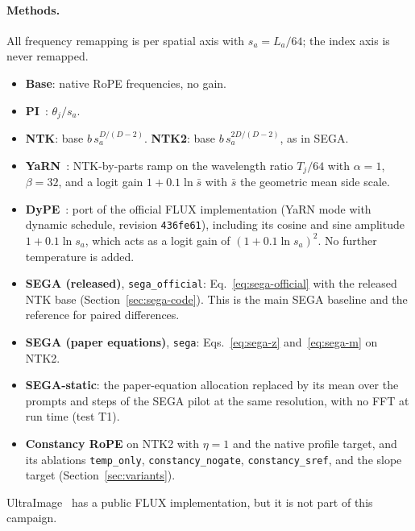\paragraph{Methods.}
All frequency remapping is per spatial axis with $s_a=L_a/64$; the index axis is never remapped.
\begin{itemize}
  \item \textbf{Base}: native RoPE frequencies, no gain.
  \item \textbf{PI}~\citep{chen2023pi}: $\theta_j/s_a$.
  \item \textbf{NTK}: base $b\,s_a^{D/(D-2)}$. \textbf{NTK2}: base $b\,s_a^{2D/(D-2)}$, as in SEGA.
  \item \textbf{YaRN}~\citep{peng2024yarn}: NTK-by-parts ramp on the wavelength ratio $T_j/64$ with $\alpha=1$, $\beta=32$, and a logit gain $1+0.1\ln\bar s$ with $\bar s$ the geometric mean side scale.
  \item \textbf{DyPE}~\citep{issachar2025dype}: port of the official FLUX implementation (YaRN mode with dynamic schedule, revision \texttt{436fe61}), including its cosine and sine amplitude $1+0.1\ln s_a$, which acts as a logit gain of $(1+0.1\ln s_a)^2$. No further temperature is added.
  \item \textbf{SEGA (released)}, \texttt{sega\_official}: Eq.~\eqref{eq:sega-official} with the released NTK base (Section~\ref{sec:sega-code}). This is the main SEGA baseline and the reference for paired differences.
  \item \textbf{SEGA (paper equations)}, \texttt{sega}: Eqs.~\eqref{eq:sega-z} and~\eqref{eq:sega-m} on NTK2.
  \item \textbf{SEGA-static}: the paper-equation allocation replaced by its mean over the prompts and steps of the SEGA pilot at the same resolution, with no FFT at run time (test T1).
  \item \textbf{Constancy RoPE} on NTK2 with $\eta=1$ and the native profile target, and its ablations \texttt{temp\_only}, \texttt{constancy\_nogate}, \texttt{constancy\_sref}, and the slope target (Section~\ref{sec:variants}). 
\end{itemize}
UltraImage~\citep{ultraimage2025} has a public FLUX implementation, but it is not part of this campaign. 

